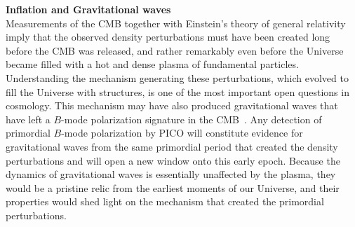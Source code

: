 \documentclass[PICOReport.tex]{subfiles}
\begin{document}
{\bf Inflation and Gravitational waves} \\ %
Measurements of the \ac{CMB} together with Einstein's theory of general relativity imply that the observed density perturbations must have been created long before the \ac{CMB} was released, and rather remarkably even before the Universe became filled with a hot and dense plasma of fundamental particles. Understanding the mechanism generating these perturbations, which evolved to fill the Universe with structures, is one of the most important open questions in cosmology. This mechanism may have also produced gravitational waves that have left a $B$-mode polarization signature in the 
CMB~\cite{Seljak:1996gy,Kamionkowski:1996zd}. 
Any detection of primordial $B$-mode polarization by PICO will constitute evidence for gravitational waves from the same primordial period that created the density perturbations and will open a new window onto this early epoch. Because the dynamics of gravitational waves is essentially unaffected by the plasma, they would be a pristine relic from the earliest moments of our Universe, and their properties would shed light on the mechanism that created the primordial perturbations. 



\end{document}
